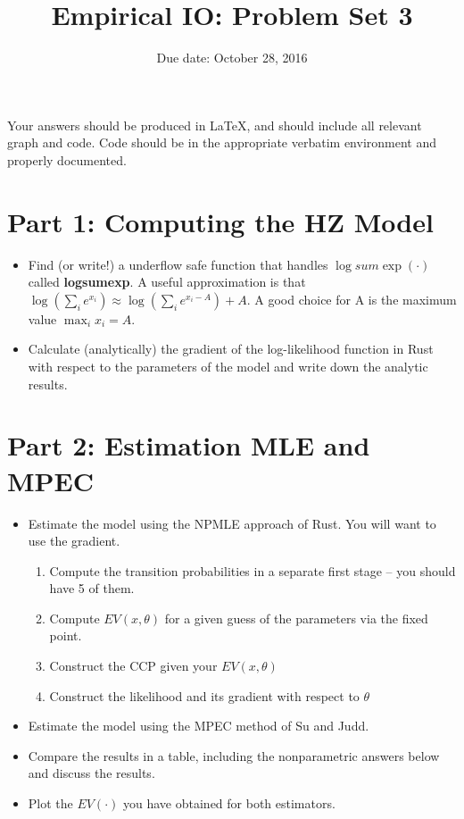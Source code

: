 \documentclass{article}
\title{Empirical IO: Problem Set 3}
\begin{document}
\small
\date{Due date: October 28, 2016}
\maketitle
Your answers should be produced in \LaTeX, and should include all relevant graph and code.  Code should be in the appropriate verbatim environment and properly documented.
\section*{Part 1: Computing the HZ Model}
\begin{itemize}
\item Find (or write!) a underflow safe function that handles $\log sum \exp (\cdot)$ called \textbf{logsumexp}. A useful approximation is that $\log (\sum_i e^{x_i}) \approx \log (\sum_i e^{x_i -A}) +A$. A good choice for A is the maximum value $\max_i x_i = A$.
\item Calculate (analytically) the gradient of the log-likelihood function in Rust with respect to the parameters of the model and write down the analytic results.
\end{itemize}

\section*{Part 2: Estimation MLE and MPEC}
\begin{itemize}
\item Estimate the model using the NPMLE approach of Rust. You will want to use the gradient.
\begin{enumerate}
\item Compute the transition probabilities in a separate first stage -- you should have 5 of them.
\item Compute $EV(x, \theta)$ for a given guess of the parameters via the fixed point.
\item Construct the CCP given your $EV(x, \theta)$
\item Construct the likelihood and its gradient with respect to $\theta$
\end{enumerate}
\item Estimate the model using the MPEC method of Su and Judd.
\item Compare the results in a table, including the nonparametric answers below and discuss the results.
\item Plot the $EV(\cdot)$ you have obtained for both estimators.
\end{itemize}
\end{document}
